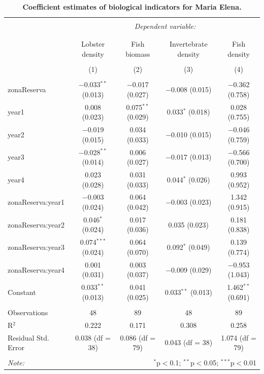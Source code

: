 \documentclass[10pt]{article}
\begin{document}
\begin{table}[h] \centering 
  \caption{{\bf Coefficient estimates of biological indicators for Maria Elena.}} 
  \label{} 
\small 
\begin{tabular}{@{\extracolsep{1pt}}lcccc} 
\\[-1.8ex]\hline 
\hline \\[-1.8ex] 
 & \multicolumn{4}{c}{\textit{Dependent variable:}} \\ 
\cline{2-5} 
\\[-1.8ex] & \multicolumn{4}{c}{} \\ 
 & Lobster density & Fish biomass & Invertebrate density & Fish density \\ 
\\[-1.8ex] & (1) & (2) & (3) & (4)\\ 
\hline \\[-1.8ex] 
 zonaReserva & $-$0.033$^{**}$ (0.013) & $-$0.017 (0.027) & $-$0.008 (0.015) & $-$0.362 (0.758) \\ 
  year1 & 0.008 (0.023) & 0.075$^{**}$ (0.029) & 0.033$^{*}$ (0.018) & 0.028 (0.755) \\ 
  year2 & $-$0.019 (0.015) & 0.034 (0.033) & $-$0.010 (0.015) & $-$0.046 (0.759) \\ 
  year3 & $-$0.028$^{**}$ (0.014) & 0.006 (0.027) & $-$0.017 (0.013) & $-$0.566 (0.700) \\ 
  year4 & 0.023 (0.028) & 0.031 (0.033) & 0.044$^{*}$ (0.026) & 0.993 (0.952) \\ 
  zonaReserva:year1 & $-$0.003 (0.024) & 0.064 (0.042) & $-$0.003 (0.023) & 1.342 (0.915) \\ 
  zonaReserva:year2 & 0.046$^{*}$ (0.024) & 0.017 (0.036) & 0.035 (0.023) & 0.181 (0.838) \\ 
  zonaReserva:year3 & 0.074$^{***}$ (0.024) & 0.064 (0.070) & 0.092$^{*}$ (0.049) & 0.139 (0.774) \\ 
  zonaReserva:year4 & 0.001 (0.031) & 0.003 (0.037) & $-$0.009 (0.029) & $-$0.953 (1.043) \\ 
  Constant & 0.033$^{**}$ (0.013) & 0.041 (0.025) & 0.033$^{**}$ (0.013) & 1.462$^{**}$ (0.691) \\ 
 \hline \\[-1.8ex] 
Observations & 48 & 89 & 48 & 89 \\ 
R$^{2}$ & 0.222 & 0.171 & 0.308 & 0.258 \\ 
Residual Std. Error & 0.038 (df = 38) & 0.086 (df = 79) & 0.043 (df = 38) & 1.074 (df = 79) \\ 
\hline 
\hline \\[-1.8ex] 
\textit{Note:}  & \multicolumn{4}{r}{$^{*}$p$<$0.1; $^{**}$p$<$0.05; $^{***}$p$<$0.01} \\ 
\end{tabular} 
\end{table} 
\end{document}
